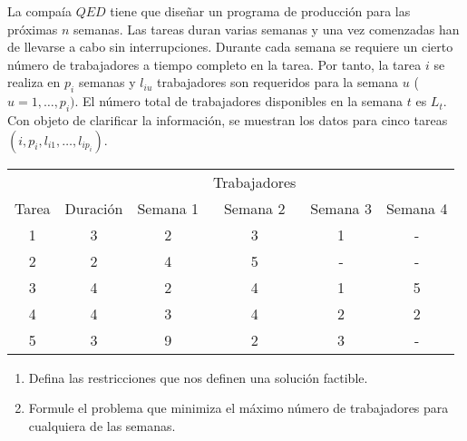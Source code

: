 \documentclass[twoside]{article}
\begin{document}
\begin{ejercicio}{12}
La compaía $QED$ tiene que diseñar un programa de producción para las próximas $n$ semanas. Las tareas duran varias semanas y una vez comenzadas han de llevarse a cabo sin interrupciones. Durante cada semana se requiere un cierto número de trabajadores a tiempo completo en la tarea. Por tanto, la tarea $i$ se realiza en $p_i$ semanas y $l_{iu}$ trabajadores son requeridos para la semana $u$ ($u=1,\dots,p_i)$. El número total de trabajadores disponibles en la semana $t$ es $L_t$. Con objeto de clarificar la información, se muestran los datos para cinco tareas $(i,p_i,l_{i1},\dots,l_{ip_{i}})$.
\begin{center}
\begin{tabular}{c|c|cccc}
\hline
& & & Trabajadores & &\\
Tarea & Duración & Semana 1 & Semana 2 & Semana 3 & Semana 4\\
\hline
\hline
1 & 3 & 2 & 3 & 1 & -\\
2 & 2 & 4 & 5 & - & -\\
3 & 4 & 2 & 4& 1 & 5\\
4 &4 & 3 & 4 & 2 & 2\\
5 & 3& 9 & 2 & 3 & -\\
\hline
\end{tabular}
\end{center}
\begin{enumerate}
\item Defina las restricciones que nos definen una solución factible.
\item Formule el problema que minimiza el máximo número de trabajadores para cualquiera de las semanas.
\end{enumerate}
\end{ejercicio}
\begin{solucion}
\end{solucion}
\end{document}
